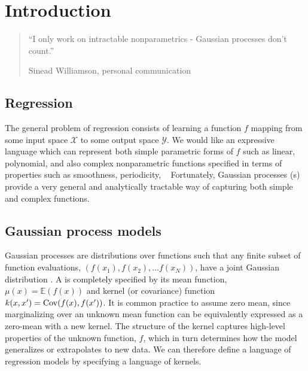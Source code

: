 
\inbpdocument

\chapter{Introduction}
\label{ch:intro}


\begin{quotation}
``I only work on intractable nonparametrics - Gaussian processes don't count.''

\hspace*{\fill} Sinead Williamson, personal communication
\end{quotation}


\section{Regression}

The general problem of regression consists of learning a function $f$ mapping from some input space $\mathcal{X}$ to some output space $\mathcal{Y}$.
We would like an expressive language which can represent both simple parametric forms of $f$ such as linear, polynomial, \etc and also complex nonparametric functions specified in terms of properties such as smoothness, periodicity, \etc~ 
Fortunately, Gaussian processes (\gp{}s) provide a very general and analytically tractable way of capturing both simple and complex functions. 

\section{Gaussian process models}

Gaussian processes are distributions over functions such that any finite subset of function evaluations, $(f(x_1), f(x_2), \ldots f(x_N))$, have a joint Gaussian distribution \citep{rasmussen38gaussian}.
A \gp{} is completely specified by its mean function, $\mu(x)=\mathbb{E}(f(x))$ and kernel (or covariance) function $k(x,x') = \operatorname{Cov}(f(x),f(x'))$.
It is common practice to assume zero mean, since marginalizing over an unknown mean function can be equivalently expressed as a zero-mean \gp{} with a new kernel.
The structure of the kernel captures high-level properties of the unknown function, $f$, which in turn determines how the model generalizes or extrapolates to new data.
We can therefore define a language of regression models by specifying a language of kernels.

